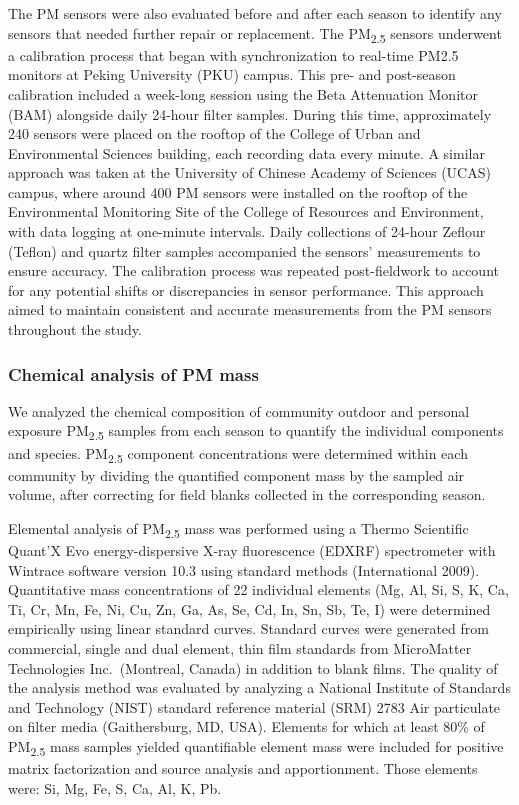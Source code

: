 \documentclass[
  letterpaper,
  DIV=11,
  numbers=noendperiod]{scrartcl}
\begin{document}
The PM sensors were also evaluated before and after each season to
identify any sensors that needed further repair or replacement. The
PM\textsubscript{2.5} sensors underwent a calibration process that began
with synchronization to real-time PM2.5 monitors at Peking University
(PKU) campus. This pre- and post-season calibration included a week-long
session using the Beta Attenuation Monitor (BAM) alongside daily 24-hour
filter samples. During this time, approximately 240 sensors were placed
on the rooftop of the College of Urban and Environmental Sciences
building, each recording data every minute. A similar approach was taken
at the University of Chinese Academy of Sciences (UCAS) campus, where
around 400 PM sensors were installed on the rooftop of the Environmental
Monitoring Site of the College of Resources and Environment, with data
logging at one-minute intervals. Daily collections of 24-hour Zeflour
(Teflon) and quartz filter samples accompanied the sensors' measurements
to ensure accuracy. The calibration process was repeated post-fieldwork
to account for any potential shifts or discrepancies in sensor
performance. This approach aimed to maintain consistent and accurate
measurements from the PM sensors throughout the study.

\hypertarget{chemical-analysis-of-pm-mass}{%
\subsubsection{Chemical analysis of PM
mass}\label{chemical-analysis-of-pm-mass}}

We analyzed the chemical composition of community outdoor and personal
exposure PM\textsubscript{2.5} samples from each season to quantify the
individual components and species. PM\textsubscript{2.5} component
concentrations were determined within each community by dividing the
quantified component mass by the sampled air volume, after correcting
for field blanks collected in the corresponding season.

Elemental analysis of PM\textsubscript{2.5} mass was performed using a
Thermo Scientific Quant'X Evo energy-dispersive X-ray fluorescence
(EDXRF) spectrometer with Wintrace software version 10.3 using standard
methods (International 2009). Quantitative mass concentrations of 22
individual elements (Mg, Al, Si, S, K, Ca, Ti, Cr, Mn, Fe, Ni, Cu, Zn,
Ga, As, Se, Cd, In, Sn, Sb, Te, I) were determined empirically using
linear standard curves. Standard curves were generated from commercial,
single and dual element, thin film standards from MicroMatter
Technologies Inc.~(Montreal, Canada) in addition to blank films. The
quality of the analysis method was evaluated by analyzing a National
Institute of Standards and Technology (NIST) standard reference material
(SRM) 2783 Air particulate on filter media (Gaithersburg, MD, USA).
Elements for which at least 80\% of PM\textsubscript{2.5} mass samples
yielded quantifiable element mass were included for positive matrix
factorization and source analysis and apportionment. Those elements
were: Si, Mg, Fe, S, Ca, Al, K, Pb.
\end{document}
